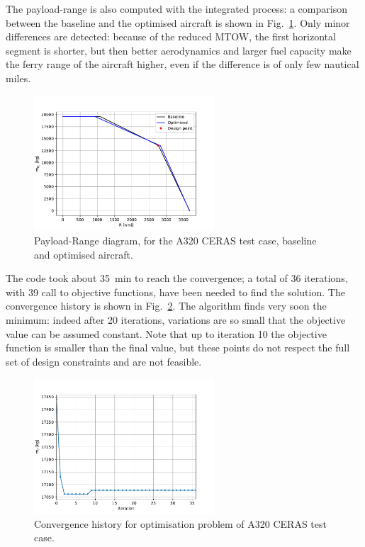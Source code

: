 The payload-range is also computed with the integrated process: a comparison between the baseline and the optimised aircraft is shown in Fig.~\ref{fig:a320_base_optim_pl_range}. 
Only minor differences are detected: because of the reduced MTOW, the first horizontal segment is shorter, but then better aerodynamics and larger fuel capacity make the ferry range of the aircraft higher, even if the difference is of only few nautical miles. 
\begin{figure}[!h]
	\centering
	\includegraphics[keepaspectratio, width=0.6\textwidth]{images/chap2/fast_base_optim_pl_range}
	\caption{Payload-Range diagram, for the A320 CERAS test case, baseline and optimised aircraft.}
	\label{fig:a320_base_optim_pl_range}
\end{figure}

The code took about 35~\si{\minute} to reach the convergence; a total of 36 iterations, with 39 call to objective functions, have been needed to find the solution. 
The convergence history is shown in Fig.~\ref{fig:a320_optim_conv_history}. 
The algorithm finds very soon the minimum: indeed after 20 iterations, variations are so small that the objective value can be assumed constant. 
Note that up to iteration 10 the objective function is smaller than the final value, but these points do not respect the full set of design constraints and are not feasible. 
\begin{figure}[!h]
	\centering
	\includegraphics[keepaspectratio, width=0.6\textwidth]{images/chap2/fast_optim_conv_history}
	\caption{Convergence history for optimisation problem of A320 CERAS test case.}
	\label{fig:a320_optim_conv_history}
\end{figure}

